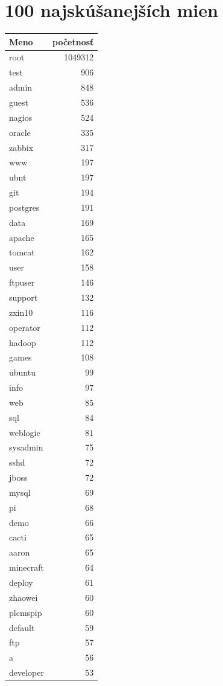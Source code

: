 \documentclass[12pt, oneside]{book}
\begin{document}
\section*{100 najskúšanejších mien}
\begin{longtable}{|l|r|}
\hline
Meno&početnosť\\
\hline
root&1049312\\ 
test&906\\ 
admin&848\\ 
guest&536\\ 
nagios&524\\ 
oracle&335\\ 
zabbix&317\\ 
www&197\\ 
ubnt&197\\ 
git&194\\ 
postgres&191\\ 
data&169\\ 
apache&165\\ 
tomcat&162\\ 
user&158\\ 
ftpuser&146\\ 
support&132\\ 
zxin10&116\\ 
operator&112\\ 
hadoop&112\\ 
games&108\\ 
ubuntu&99\\ 
info&97\\ 
web&85\\ 
sql&84\\ 
weblogic&81\\ 
sysadmin&75\\ 
sshd&72\\ 
jboss&72\\ 
mysql&69\\ 
pi&68\\ 
demo&66\\ 
cacti&65\\ 
aaron&65\\ 
minecraft&64\\ 
deploy&61\\ 
zhaowei&60\\ 
plcmspip&60\\ 
default&59\\ 
ftp&57\\ 
a&56\\ 
developer&53\\ 

\end{longtable}
\end{document}
